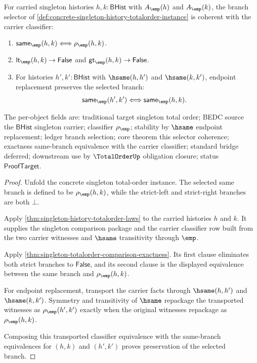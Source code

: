 \begin{theorem}
\label{thm:totalorder-carrier-selector-classifier-coherence}
For carried singleton histories $h,k:\mathsf{BHist}$ with $A_{\emp}(h)$ and
$A_{\emp}(k)$, the branch selector of
\autoref{def:concrete-singleton-history-totalorder-instance} is coherent with
the carrier classifier:
\begin{enumerate}
  \item $\mathsf{same}_{\emp}(h,k)\Longleftrightarrow\rho_{\emp}(h,k)$.
  \item $\mathsf{lt}_{\emp}(h,k)\to\mathsf{False}$ and
  $\mathsf{gt}_{\emp}(h,k)\to\mathsf{False}$.
  \item For histories $h',k':\mathsf{BHist}$ with $\hsame(h,h')$ and
  $\hsame(k,k')$, endpoint replacement preserves the selected branch:
  $$
  \mathsf{same}_{\emp}(h',k')\Longleftrightarrow
  \mathsf{same}_{\emp}(h,k).
  $$
\end{enumerate}

The per-object fields are: traditional target singleton total order; BEDC
source the $\mathsf{BHist}$ singleton carrier; classifier $\rho_{\emp}$;
stability by $\hsame$ endpoint replacement; ledger branch selection; core
theorem this selector coherence; exactness same-branch equivalence with the
carrier classifier; standard bridge deferred; downstream use by
$\TotalOrderUp$ obligation closure; status $\mathsf{ProofTarget}$.
\end{theorem}
\begin{proof}
Unfold the concrete singleton total-order instance. The selected same branch is
defined to be $\rho_{\emp}(h,k)$, while the strict-left and strict-right
branches are both $\bot$.

Apply \autoref{thm:singleton-history-totalorder-laws} to the carried histories
$h$ and $k$. It supplies the singleton comparison package and the carrier
classifier row built from the two carrier witnesses and $\hsame$ transitivity
through $\emp$.

Apply \autoref{thm:singleton-totalorder-comparison-exactness}. Its first clause
eliminates both strict branches to $\mathsf{False}$, and its second clause is
the displayed equivalence between the same branch and $\rho_{\emp}(h,k)$.

For endpoint replacement, transport the carrier facts through
$\hsame(h,h')$ and $\hsame(k,k')$. Symmetry and transitivity of $\hsame$
repackage the transported witnesses as $\rho_{\emp}(h',k')$ exactly when the
original witnesses repackage as $\rho_{\emp}(h,k)$.

Composing this transported classifier equivalence with the same-branch
equivalences for $(h,k)$ and $(h',k')$ proves preservation of the selected
branch.
\end{proof}

